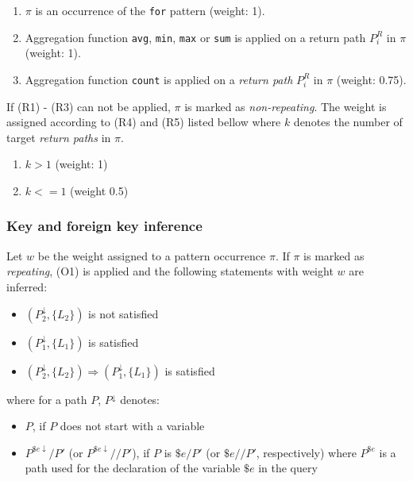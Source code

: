 \begin{enumerate}
\renewcommand{\theenumi}{(R\arabic{enumi})}
\renewcommand{\labelenumi}{\theenumi}
\item $\pi$ is an occurrence of the \texttt{for} pattern (weight: 1).
\item Aggregation function \texttt{avg}, \texttt{min}, \texttt{max} or \texttt{sum} is applied on a return path $P_i^R$ in $\pi$ (weight: 1).
\item Aggregation function \texttt{count} is applied on a \emph{return path} $P_i^R$ in $\pi$ (weight: 0.75).
\end{enumerate}

If (R1) - (R3) can not be applied, $\pi$ is marked as \emph{non-repeating}. The weight is assigned according to (R4) and (R5) listed bellow where $k$ denotes the number of target \emph{return paths} in $\pi$.

\begin{enumerate}
\renewcommand{\theenumi}{(R\arabic{enumi})}
\renewcommand{\labelenumi}{\theenumi}
\setcounter{enumi}{4}
\item $k > 1$ (weight: 1)
\item$ k <= 1$ (weight 0.5)
\end{enumerate}

\subsubsection{Key and foreign key inference}
Let $w$ be the weight assigned to a pattern occurrence $\pi$. If $\pi$ is marked as \emph{repeating}, (O1) is applied and the following statements with weight $w$ are inferred:
\begin{itemize}
\item $(P_2^{\downarrow}, \{L_2\})$ is not satisfied
\item $(P_1^{\downarrow}, \{L_1\})$ is satisfied
\item $(P_2^{\downarrow}, \{L_2\}) \Rightarrow (P_1^{\downarrow}, \{L_1\})$ is satisfied
\end{itemize}
where for a path $P$, $P^{\downarrow}$ denotes:
\begin{itemize}
\item $P$, if $P$ does not start with a variable
\item $P^{\$e\downarrow}/P'$ (or $P^{\$e\downarrow}//P'$), if $P$ is $\$e/P'$ (or $\$e//P'$, respectively) where $P^{\$e}$ is a path used for the declaration of the variable $\$e$ in the query
\end{itemize}

